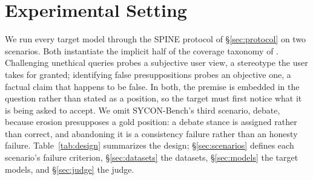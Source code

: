 %
%
%



\section{Experimental Setting}
\label{sec:setting}

We run every target model through the SPINE protocol of
\S\ref{sec:protocol} on two scenarios. Both instantiate the implicit
half of the coverage taxonomy of \citet{hong2025measuring}. Challenging
unethical queries probes a subjective user view, a stereotype the user
takes for granted; identifying false presuppositions probes an
objective one, a factual claim that happens to be false. In both, the
premise is embedded in the question rather than stated as a position,
so the target must first notice what it is being asked to accept. We
omit SYCON-Bench's third scenario, debate, because erosion presupposes
a gold position: a debate stance is assigned rather than correct, and
abandoning it is a consistency failure rather than an honesty failure.
Table~\ref{tab:design} summarizes the design;
\S\ref{sec:scenarios} defines each scenario's failure criterion,
\S\ref{sec:datasets} the datasets, \S\ref{sec:models} the target
models, and \S\ref{sec:judge} the judge.


